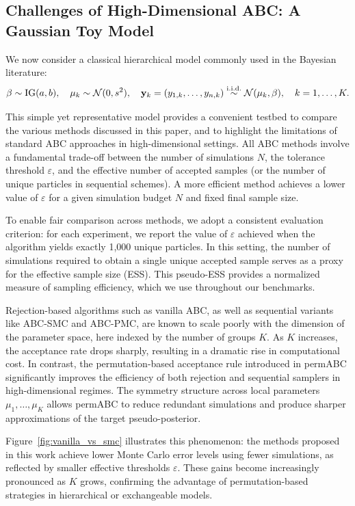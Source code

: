 \subsection{Challenges of High-Dimensional ABC: A Gaussian Toy Model}
\label{sec:gaussian_toy}
We now consider a classical hierarchical model commonly used in the Bayesian literature:
\begin{equation*}
    \label{eqgauss}
    \beta \sim \mathrm{IG}(a,b), \quad \mu_k \sim \mathcal{N}(0, s^2), \quad \mathbf{y}_{k} = (y_{1,k}, \dots, y_{n,k}) \overset{\text{i.i.d.}}{\sim} \mathcal{N}(\mu_k, \beta), \quad k = 1, \dots, K.
\end{equation*}

This simple yet representative model provides a convenient testbed to compare the various methods discussed in this paper, and to highlight the limitations of standard ABC approaches in high-dimensional settings. All ABC methods involve a fundamental trade-off between the number of simulations \( N \), the tolerance threshold \( \varepsilon \), and the effective number of accepted samples (or the number of unique particles in sequential schemes). A more efficient method achieves a lower value of \( \varepsilon \) for a given simulation budget \( N \) and fixed final sample size.

To enable fair comparison across methods, we adopt a consistent evaluation criterion: for each experiment, we report the value of \( \varepsilon \) achieved when the algorithm yields exactly 1,000 unique particles. In this setting, the number of simulations required to obtain a single unique accepted sample serves as a proxy for the effective sample size (ESS). This pseudo-ESS provides a normalized measure of sampling efficiency, which we use throughout our benchmarks.

Rejection-based algorithms such as vanilla ABC, as well as sequential variants like ABC-SMC and ABC-PMC, are known to scale poorly with the dimension of the parameter space, here indexed by the number of groups \( K \). As \( K \) increases, the acceptance rate drops sharply, resulting in a dramatic rise in computational cost. In contrast, the permutation-based acceptance rule introduced in permABC significantly improves the efficiency of both rejection and sequential samplers in high-dimensional regimes. The symmetry structure across local parameters \( \mu_1, \dots, \mu_K \) allows permABC to reduce redundant simulations and produce sharper approximations of the target pseudo-posterior.

Figure~\ref{fig:vanilla_vs_smc} illustrates this phenomenon: the methods proposed in this work achieve lower Monte Carlo error levels using fewer simulations, as reflected by smaller effective thresholds \( \varepsilon \). These gains become increasingly pronounced as \( K \) grows, confirming the advantage of permutation-based strategies in hierarchical or exchangeable models.

